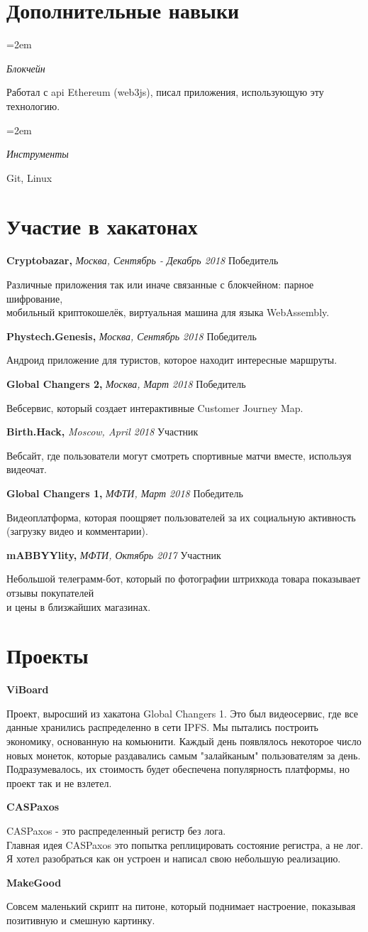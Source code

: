 \documentclass[fontsize=11pt]{article}
\newlength{\spacebox}
\newcommand{\sepspace}{\vspace*{1em}}   %
\newcommand{\NewPart}[1]{\section*{#1}}
\newcommand{\PersonalEntry}[2]{
    \noindent\hangindent=2em\hangafter=0 %
    \parbox{\spacebox}{                  %
    \textit{#1}}                      %
    \hspace{1.5em} #2 \par}              %
\newcommand{\SkillsEntry}[2]{                %
    \noindent\hangindent=2em\hangafter=0 %
    \parbox{\spacebox}{                  %
    \textit{#1}}                    %
    \hspace{1.5em} #2 \par}              %
\newcommand{\ProgrammingEntry}[2]{
    \noindent \textbf{#1} \hfill      %

    \noindent \small #2 %
    \normalsize \par}
\newcommand{\EducationEntry}[4]{
    \noindent \textbf{#1} \hfill      %
    \colorbox{Black}{
      \parbox{10em}{
      \color{White} \centering #2}} \par   %
    \noindent \textit{#3} \par        %
    \noindent\hangindent=2em\hangafter=0 \small #4 %
    \normalsize \par}
\newcommand{\AwardEntry}[4]{         %
    \noindent \textbf{#1} \noindent \textit{#3} \hfill {#2} \par
    \noindent \small #4 %
    \normalsize \par}
\begin{document}
\NewPart{Дополнительные навыки}{}
\SkillsEntry{Блокчейн}{Работал с api Ethereum (web3js), писал приложения, использующую эту технологию.}
\SkillsEntry{Инструменты}{Git, Linux}

\NewPart{Участие в хакатонах}{}

\AwardEntry{Cryptobazar, }{Победитель}
{Москва, Сентябрь - Декабрь 2018}
{Различные приложения так или иначе связанные с блокчейном: парное шифрование, \\ мобильный криптокошелёк, виртуальная машина для языка WebAssembly.}
\sepspace
\AwardEntry{Phystech.Genesis,}{Победитель}
{Москва, Сентябрь 2018}
{Андроид приложение для туристов, которое находит интересные маршруты.}
\sepspace
\AwardEntry{Global Changers 2,}{Победитель}
{Москва, Март 2018}
{Вебсервис, который создает интерактивные Customer Journey Map.}
\sepspace
\AwardEntry{Birth.Hack,}{Участник}
{Moscow, April 2018}
{Вебсайт, где пользователи могут смотреть спортивные матчи вместе, используя видеочат.}
\sepspace
\AwardEntry{Global Changers 1,}{Победитель}
{МФТИ, Март 2018}
{Видеоплатформа, которая поощряет пользователей за их социальную активность (загрузку видео и комментарии).}
\sepspace
\AwardEntry{mABBYYlity,}{Участник}
{МФТИ, Октябрь 2017}
{Небольшой телеграмм-бот, который по фотографии штрихкода товара показывает отзывы покупателей \\ и цены в близжайших магазинах.}

\NewPart{Проекты}{}
\ProgrammingEntry
{ViBoard}
{Проект, выросший из хакатона Global Changers 1. Это был видеосервис, где все данные хранились распределенно в сети IPFS. Мы пытались построить экономику, основанную на комьюнити. Каждый день появлялось некоторое число новых монеток, которые раздавались самым "залайканым" \space пользователям за день. Подразумевалось, их стоимость будет обеспечена популярность платформы, но проект так и не взлетел.}
\bigskip
\ProgrammingEntry
{CASPaxos}
{CASPaxos - это распределенный регистр без лога. \\ Главная идея CASPaxos это попытка реплицировать состояние регистра, а не лог. Я хотел разобраться как он устроен и написал свою небольшую реализацию.}
\bigskip
\ProgrammingEntry
{MakeGood}
{Совсем маленький скрипт на питоне, который поднимает настроение, показывая позитивную и смешную картинку.}
\end{document}

